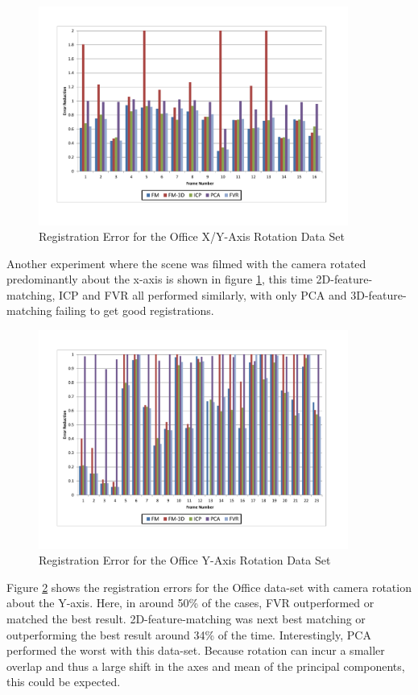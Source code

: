 \begin{figure}[!htb]
\centering
\includegraphics[width=4.0in]{images/results/Office_Texture_Rotate_XAxis}
\caption{Registration Error for the Office X/Y-Axis Rotation Data Set}
\label{fig:PET10}
\end{figure}

Another experiment where the scene was filmed with the camera rotated predominantly about the x-axis is shown in figure \ref{fig:PET10}, this time 2D-feature-matching, ICP and FVR all performed similarly, with only PCA and 3D-feature-matching failing to get good registrations. 

\begin{figure}[!htb]
\centering
\includegraphics[width=4.0in]{images/results/Office_Texture_Rotation}
\caption{Registration Error for the Office Y-Axis Rotation Data Set}
\label{fig:PET11}
\end{figure}

Figure \ref{fig:PET11} shows the registration errors for the Office data-set with camera rotation about the Y-axis. Here, in around 50\% of the cases, FVR outperformed or matched the best result. 2D-feature-matching was next best matching or outperforming the best result around 34\% of the time. Interestingly, PCA performed the worst with this data-set. Because rotation can incur a smaller overlap and thus a large shift in the axes and mean of the principal components, this could be expected. \\

